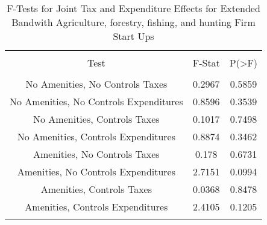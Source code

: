 
\begin{table}[!htbp] \centering 
  \caption{F-Tests for Joint Tax and Expenditure Effects for Extended Bandwith Agriculture, forestry, fishing, and hunting Firm Start Ups} 
  \label{11Ftests} 
\begin{tabular}{@{\extracolsep{5pt}} ccc} 
\\[-1.8ex]\hline 
\hline \\[-1.8ex] 
Test & F-Stat & P(\textgreater F) \\ 
\hline \\[-1.8ex] 
No Amenities, No Controls Taxes & 0.2967 & 0.5859 \\ 
No Amenities, No Controls Expenditures & 0.8596 & 0.3539 \\ 
No Amenities, Controls Taxes & 0.1017 & 0.7498 \\ 
No Amenities, Controls Expenditures & 0.8874 & 0.3462 \\ 
Amenities, No Controls Taxes & 0.178 & 0.6731 \\ 
Amenities, No Controls Expenditures & 2.7151 & 0.0994 \\ 
Amenities, Controls Taxes & 0.0368 & 0.8478 \\ 
Amenities, Controls Expenditures & 2.4105 & 0.1205 \\ 
\hline \\[-1.8ex] 
\end{tabular} 
\end{table} 
